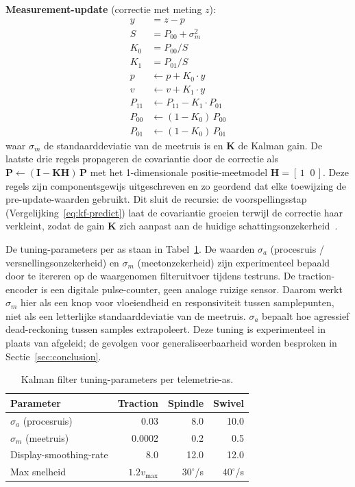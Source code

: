 \documentclass[10pt, a4paper, twocolumn]{article}
\begin{document}
\textbf{Measurement-update} (correctie met meting $z$):
\begin{align}
\label{eq:kf-correct}
y &= z - p \nonumber\\
S &= P_{00} + \sigma_m^2 \nonumber\\
K_0 &= P_{00} / S \\
K_1 &= P_{01} / S \nonumber\\
p &\leftarrow p + K_0 \cdot y \nonumber\\
v &\leftarrow v + K_1 \cdot y \nonumber\\
P_{11} &\leftarrow P_{11} - K_1 \cdot P_{01} \nonumber\\
P_{00} &\leftarrow (1 - K_0)\,P_{00} \nonumber\\
P_{01} &\leftarrow (1 - K_0)\,P_{01} \nonumber
\end{align}
waar $\sigma_m$ de standaarddeviatie van de meetruis is en $\mathbf{K}$
de Kalman gain. De laatste drie regels propageren de covariantie door de
correctie als $\mathbf{P} \leftarrow (\mathbf{I} - \mathbf{K}\mathbf{H})\,\mathbf{P}$
met het 1-dimensionale positie-meetmodel $\mathbf{H} = [\,1\;\;0\,]$. Deze regels zijn
componentsgewijs uitgeschreven en zo geordend dat elke toewijzing de
pre-update-waarden gebruikt.
Dit sluit de recursie: de voorspellingsstap
(Vergelijking~\ref{eq:kf-predict}) laat de covariantie groeien terwijl de
correctie haar verkleint, zodat de gain $\mathbf{K}$ zich aanpast aan de huidige
schattingsonzekerheid~\cite{welch1995kalman}.

De tuning-parameters per as staan in Tabel~\ref{tab:kalman}. De waarden
$\sigma_a$ (procesruis / versnellingsonzekerheid) en $\sigma_m$
(meetonzekerheid) zijn experimenteel bepaald door te itereren op de waargenomen
filteruitvoer tijdens testruns. De traction-encoder is een digitale pulse-counter, geen analoge ruizige
sensor. Daarom werkt $\sigma_m$ hier als een knop voor vloeiendheid en
responsiviteit tussen samplepunten, niet als een letterlijke standaarddeviatie
van de meetruis. $\sigma_a$ bepaalt hoe agressief dead-reckoning tussen samples
extrapoleert. Deze tuning is experimenteel in plaats van afgeleid; de gevolgen voor
generaliseerbaarheid worden besproken in Sectie~\ref{sec:conclusion}.

\begin{table}[t]
\centering
\caption{Kalman filter tuning-parameters per telemetrie-as.}
\label{tab:kalman}
\small
\begin{tabular}{@{}lrrr@{}}
\toprule
\textbf{Parameter} & \textbf{Traction} & \textbf{Spindle} & \textbf{Swivel} \\
\midrule
$\sigma_a$ (procesruis) & 0.03 & 8.0 & 10.0 \\
$\sigma_m$ (meetruis) & 0.0002 & 0.2 & 0.5 \\
Display-smoothing-rate & 8.0 & 12.0 & 12.0 \\
Max snelheid & $1.2 v_{\max}$ & $30^\circ$/s & $40^\circ$/s \\
\bottomrule
\end{tabular}
\end{table}
\end{document}
